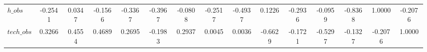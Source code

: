 \begin{center}
\begin{longtable}{lcccccccccccccc}
$h\_obs         $	 & 	          -0.2541	 & 	           0.0347	 & 	          -0.1566	 & 	          -0.3367	 & 	          -0.3967	 & 	          -0.0808	 & 	          -0.2517	 & 	          -0.4937	 & 	           0.1226	 & 	          -0.2936	 & 	          -0.0959	 & 	          -0.8368	 & 	           1.0000	 & 	          -0.2076 \\ 
$tech\_obs      $	 & 	           0.3266	 & 	           0.4554	 & 	           0.4689	 & 	           0.2695	 & 	          -0.1983	 & 	           0.2937	 & 	           0.0045	 & 	           0.0036	 & 	          -0.6629	 & 	          -0.1721	 & 	          -0.5297	 & 	          -0.1327	 & 	          -0.2076	 & 	           1.0000 \\ 
\end{longtable}
 \end{center}
